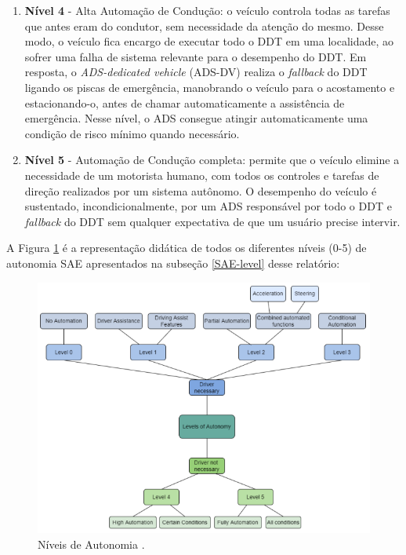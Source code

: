 \begin{enumerate}
\item \textbf{Nível 4} - Alta Automação de Condução: o veículo controla todas as tarefas 
que antes eram do condutor, sem necessidade da atenção do mesmo. Desse modo, o veículo fica encargo de executar todo o DDT em uma localidade, ao sofrer uma falha de sistema relevante para o desempenho do DDT. Em resposta, o \textit{ADS-dedicated vehicle} (ADS-DV) realiza o \textit{fallback} do DDT ligando os piscas de emergência, manobrando o veículo para o acostamento e estacionando-o, antes de chamar automaticamente a assistência de emergência. Nesse  nível, o ADS consegue atingir automaticamente uma condição de risco mínimo quando necessário.

\item \textbf{Nível 5} - Automação de Condução completa: permite que o veículo elimine a necessidade de um motorista humano, com todos os controles e tarefas de direção realizados por um sistema autônomo. O desempenho do veículo é sustentado, incondicionalmente, por um ADS responsável por todo o DDT e \textit{fallback} do DDT sem qualquer expectativa de que um usuário precise intervir.

\end{enumerate}

A Figura \ref{niveis-auto} é a representação didática de todos os diferentes níveis (0-5) de autonomia SAE apresentados na subseção \ref{SAE-level} desse relatório:

\begin{figure}[H]
\centering
\includegraphics[width=\textwidth]{Figures/level-auto.png}
\caption{Níveis de Autonomia \cite{review-auto}.}
\label{niveis-auto}
\end{figure}

